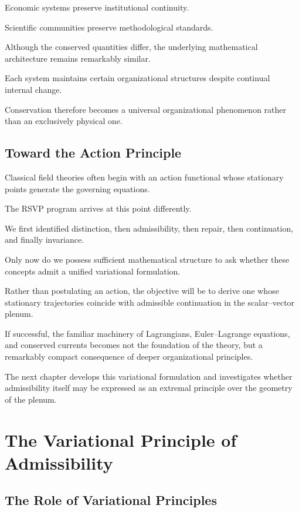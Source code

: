 \documentclass[11pt,oneside]{book}
\numberwithin{equation}{chapter}
\theoremstyle{definition}
\theoremstyle{plain}
\begin{document}
Economic systems preserve institutional continuity.

Scientific communities preserve methodological standards.

Although the conserved quantities differ, the underlying mathematical
architecture remains remarkably similar.

Each system maintains certain organizational structures despite continual
internal change.

Conservation therefore becomes a universal organizational phenomenon rather
than an exclusively physical one.

\section{Toward the Action Principle}

Classical field theories often begin with an action functional whose
stationary points generate the governing equations.

The RSVP program arrives at this point differently.

We first identified distinction, then admissibility, then repair, then
continuation, and finally invariance.

Only now do we possess sufficient mathematical structure to ask whether
these concepts admit a unified variational formulation.

Rather than postulating an action, the objective will be to derive one whose
stationary trajectories coincide with admissible continuation in the
scalar--vector plenum.

If successful, the familiar machinery of Lagrangians, Euler--Lagrange
equations, and conserved currents becomes not the foundation of the theory,
but a remarkably compact consequence of deeper organizational principles.

The next chapter develops this variational formulation and investigates
whether admissibility itself may be expressed as an extremal principle over
the geometry of the plenum.

\chapter{The Variational Principle of Admissibility}

\section{The Role of Variational Principles}
\end{document}
